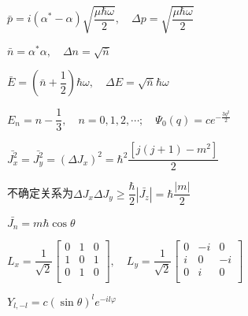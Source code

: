  $ \bar{p}=i(\alpha^{*}-\alpha)\sqrt{\dfrac{\mu\hbar\omega}{2}},\quad \Delta p=\sqrt{\dfrac{\mu\hbar\omega}{2}} $

 $ \bar{n}=\alpha^{*}\alpha,\quad \Delta n=\sqrt{\bar{n}} $

 $ \bar{E}=\left(\bar{n}+\dfrac{1}{2}\right)\hbar\omega,\quad \Delta E=\sqrt{\bar{n}}\hbar\omega $

\answer $ E_{n}=n-\dfrac{1}{3},\quad n=0,1,2,\cdots;\quad \varPsi_{0}(q)=ce^{-\frac{3q^{2}}{2}} $

			

\answer $\bar{J_{x}^{2}}=\bar{J_{y}^{2}}=(\Delta J_{x})^{2}=\hbar^{2}\dfrac{[j(j+1)-m^{2}]}{2} $

  不确定关系为$ \Delta J_{x}\Delta J_{y}\geqslant\dfrac{\hbar}{2}|\bar{J_{z}}|=\hbar\dfrac{|m|}{2} $

\answer $ \bar{J_{n}}=m\hbar\cos\theta $

\answer $ L_{x}=\dfrac{1}{\sqrt{2}}\begin{bmatrix}
	0 & 1 & 0 \\ 1 & 0 & 1 \\ 0 & 1 & 0 \\ 
\end{bmatrix},\quad L_{y}=\dfrac{1}{\sqrt{2}}\begin{bmatrix}
	0 & -i & 0 \\ i & 0 & -i \\ 0 & i & 0 \\ 
\end{bmatrix} $

\answer $ Y_{l,-l}=c(\sin\theta)^{l}e^{-il\varphi} $